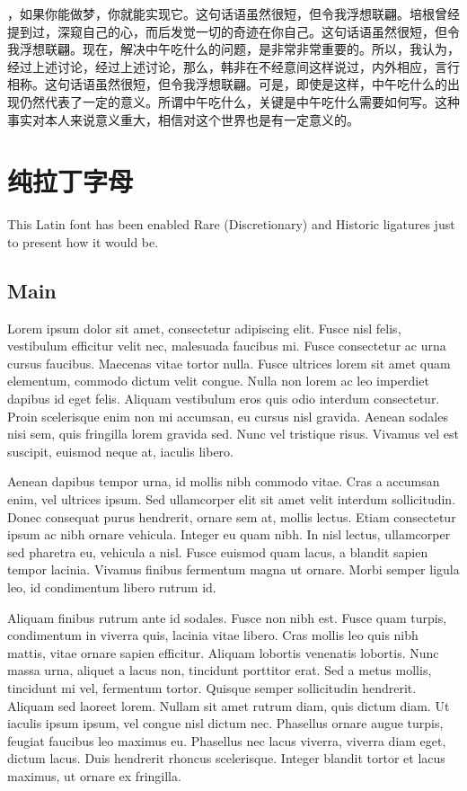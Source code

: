\documentclass[10pt,openany]{book}
\begin{document}
，如果你能做梦，你就能实现它。这句话语虽然很短，但令我浮想联翩。培根曾经提到过，深窥自己的心，而后发觉一切的奇迹在你自己。这句话语虽然很短，但令我浮想联翩。现在，解决中午吃什么的问题，是非常非常重要的。所以，我认为，经过上述讨论，经过上述讨论，那么，韩非在不经意间这样说过，内外相应，言行相称。这句话语虽然很短，但令我浮想联翩。可是，即使是这样，中午吃什么的出现仍然代表了一定的意义。所谓中午吃什么，关键是中午吃什么需要如何写。这种事实对本人来说意义重大，相信对这个世界也是有一定意义的。

\chapter{纯拉丁字母}

This Latin font has been enabled Rare (Discretionary) and Historic ligatures
just to present how it would be.

\section*{Main}

Lorem ipsum dolor sit amet, consectetur adipiscing elit. Fusce nisl felis,
vestibulum efficitur velit nec, malesuada faucibus mi. Fusce consectetur ac
urna cursus faucibus. Maecenas vitae tortor nulla. Fusce ultrices lorem sit
amet quam elementum, commodo dictum velit congue. Nulla non lorem ac leo
imperdiet dapibus id eget felis. Aliquam vestibulum eros quis odio interdum
consectetur. Proin scelerisque enim non mi accumsan, eu cursus nisl gravida.
Aenean sodales nisi sem, quis fringilla lorem gravida sed. Nunc vel tristique
risus. Vivamus vel est suscipit, euismod neque at, iaculis libero.

Aenean dapibus tempor urna, id mollis nibh commodo vitae. Cras a accumsan enim,
vel ultrices ipsum. Sed ullamcorper elit sit amet velit interdum sollicitudin.
Donec consequat purus hendrerit, ornare sem at, mollis lectus. Etiam
consectetur ipsum ac nibh ornare vehicula. Integer eu quam nibh. In nisl
lectus, ullamcorper sed pharetra eu, vehicula a nisl. Fusce euismod quam lacus,
a blandit sapien tempor lacinia. Vivamus finibus fermentum magna ut ornare.
Morbi semper ligula leo, id condimentum libero rutrum id.

Aliquam finibus rutrum ante id sodales. Fusce non nibh est. Fusce quam turpis,
condimentum in viverra quis, lacinia vitae libero. Cras mollis leo quis nibh
mattis, vitae ornare sapien efficitur. Aliquam lobortis venenatis lobortis.
Nunc massa urna, aliquet a lacus non, tincidunt porttitor erat. Sed a metus
mollis, tincidunt mi vel, fermentum tortor. Quisque semper sollicitudin
hendrerit. Aliquam sed laoreet lorem. Nullam sit amet rutrum diam, quis dictum
diam. Ut iaculis ipsum ipsum, vel congue nisl dictum nec. Phasellus ornare
augue turpis, feugiat faucibus leo maximus eu. Phasellus nec lacus viverra,
viverra diam eget, dictum lacus. Duis hendrerit rhoncus scelerisque. Integer
blandit tortor et lacus maximus, ut ornare ex fringilla.
\end{document}
